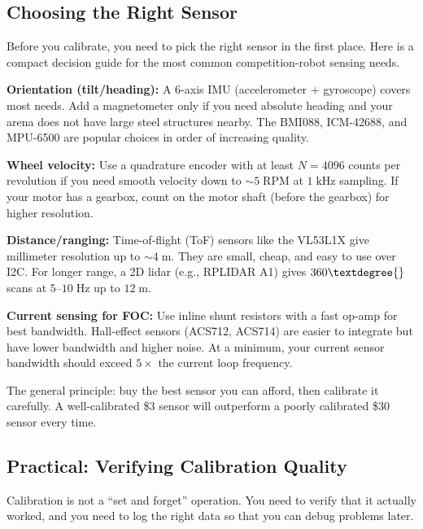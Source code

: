 \subsection{Choosing the Right Sensor}

Before you calibrate, you need to pick the right sensor in the first place. Here is a compact decision guide for the most common competition-robot sensing needs.

\textbf{Orientation (tilt/heading):} A 6-axis IMU (accelerometer + gyroscope) covers most needs. Add a magnetometer only if you need absolute heading and your arena does not have large steel structures nearby. The BMI088, ICM-42688, and MPU-6500 are popular choices in order of increasing quality.

\textbf{Wheel velocity:} Use a quadrature encoder with at least $N = 4096$ counts per revolution if you need smooth velocity down to $\sim\!5\;\mathrm{RPM}$ at $1\;\mathrm{kHz}$ sampling. If your motor has a gearbox, count on the motor shaft (before the gearbox) for higher resolution.

\textbf{Distance/ranging:} Time-of-flight (ToF) sensors like the VL53L1X give millimeter resolution up to $\sim\!4\;\mathrm{m}$. They are small, cheap, and easy to use over I2C. For longer range, a 2D lidar (e.g., RPLIDAR A1) gives $360\textdegree{}$ scans at $5$--$10\;\mathrm{Hz}$ up to $12\;\mathrm{m}$.

\textbf{Current sensing for FOC:} Use inline shunt resistors with a fast op-amp for best bandwidth. Hall-effect sensors (ACS712, ACS714) are easier to integrate but have lower bandwidth and higher noise. At a minimum, your current sensor bandwidth should exceed $5\times$ the current loop frequency.

The general principle: buy the best sensor you can afford, then calibrate it carefully. A well-calibrated \$3 sensor will outperform a poorly calibrated \$30 sensor every time.

\subsection{Practical: Verifying Calibration Quality}

Calibration is not a ``set and forget'' operation. You need to verify that it actually worked, and you need to log the right data so that you can debug problems later.

